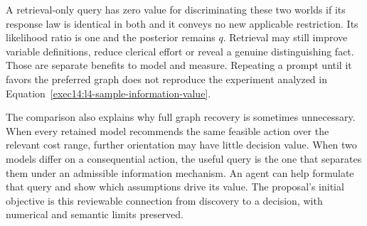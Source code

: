 A retrieval-only query has zero value for discriminating these two worlds
if its response law is identical in both and it conveys no new applicable
restriction. Its likelihood ratio is one and the posterior remains $q$.
Retrieval may still improve variable definitions, reduce clerical effort or
reveal a genuine distinguishing fact. Those are separate benefits to model
and measure. Repeating a prompt until it favors the preferred graph does
not reproduce the experiment analyzed in Equation~\eqref{exec14:l4-sample-information-value}.

The comparison also explains why full graph recovery is sometimes unnecessary.
When every retained model recommends the same feasible action over the
relevant cost range, further orientation may have little decision value.
When two models differ on a consequential action, the useful query is the
one that separates them under an admissible information mechanism. An agent
can help formulate that query and show which assumptions drive its value.
The proposal's initial objective is this reviewable connection from discovery
to a decision, with numerical and semantic limits preserved.
\label{exec14:l4-completion-end}
